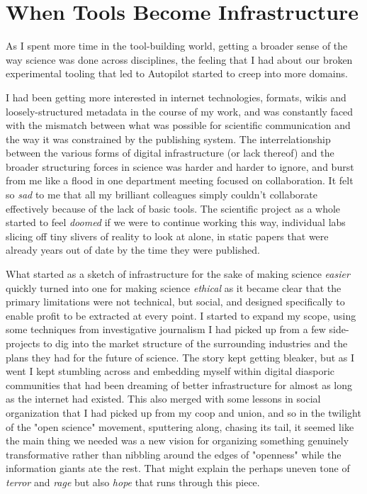 \chapter*{When Tools Become Infrastructure}

As I spent more time in the tool-building world, getting a broader sense of the way science was done across disciplines, the feeling that I had about our broken experimental tooling that led to Autopilot started to creep into more domains. 

I had been getting more interested in internet technologies, formats, wikis and loosely-structured metadata in the course of my work, and was constantly faced with the mismatch between what was possible for scientific communication and the way it was constrained by the publishing system. The interrelationship between the various forms of digital infrastructure (or lack thereof) and the broader structuring forces in science was harder and harder to ignore, and burst from me like a flood in one department meeting focused on collaboration. It felt so \textit{sad} to me that all my brilliant colleagues simply couldn't collaborate effectively because of the lack of basic tools. The scientific project as a whole started to feel \textit{doomed} if we were to continue working this way, individual labs slicing off tiny slivers of reality to look at alone, in static papers that were already years out of date by the time they were published. 

What started as a sketch of infrastructure for the sake of making science \textit{easier} quickly turned into one for making science \textit{ethical} as it became clear that the primary limitations were not technical, but social, and designed specifically to enable profit to be extracted at every point. I started to expand my scope, using some techniques from investigative journalism I had picked up from a few side-projects to dig into the market structure of the surrounding industries and the plans they had for the future of science. The story kept getting bleaker, but as I went I kept stumbling across and embedding myself within digital diasporic communities that had been dreaming of better infrastructure for almost as long as the internet had existed. This also merged with some lessons in social organization that I had picked up from my coop and union, and so in the twilight of the "open science" movement, sputtering along, chasing its tail, it seemed like the main thing we needed was a new vision for organizing something genuinely transformative rather than nibbling around the edges of "openness" while the information giants ate the rest. That might explain the perhaps uneven tone of \textit{terror} and \textit{rage} but also \textit{hope} that runs through this piece. 

